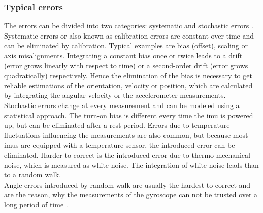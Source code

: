 \subsubsection{Typical  errors}
The errors can be divided into two categories: systematic and stochastic errors \cite{Zhang2019}.
Systematic errors or also known as calibration errors are constant over time and can be eliminated by calibration.
Typical examples are bias (offset), scaling or axis misalignments.
Integrating a constant bias once or twice leads to a drift (error grows linearly with respect to time) or a second-order drift (error grows quadratically) respectively.
Hence the elimination of the bias is necessary to get reliable estimations of the orientation, velocity or position, which are calculated by integrating the angular velocity or the accelerometer measurements.\\
Stochastic errors change at every measurement and can be modeled using a statistical approach.
The turn-on bias is different every time the \gls{imu} is powered up, but can be eliminated after a rest period.
Errors due to temperature fluctuations influencing the measurements are also common, but because most \gls{imu}s are equipped with a temperature sensor, the introduced error can be eliminated.
Harder to correct is the introduced error due to thermo-mechanical noise, which is measured as white noise.
The integration of white noise leads than to a random walk.\\
Angle errors introduced by random walk are usually the hardest to correct and are the reason, why the measurements of the gyroscope can not be trusted over a long period of time \cite{Woodman07anintroduction}.


